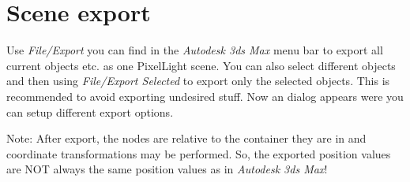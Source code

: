 \chapter{Scene export}
Use \emph{File/Export} you can find in the \emph{Autodesk 3ds Max} menu bar to export all current objects etc. as one PixelLight scene. You can also select different objects and then using \emph{File/Export Selected} to export only the selected objects. This is recommended to avoid exporting undesired stuff. Now an dialog appears were you can setup different export options.

Note: After export, the nodes are relative to the container they are in and coordinate transformations may be performed. So, the exported position values are NOT always the same position values as in \emph{Autodesk 3ds Max}!
